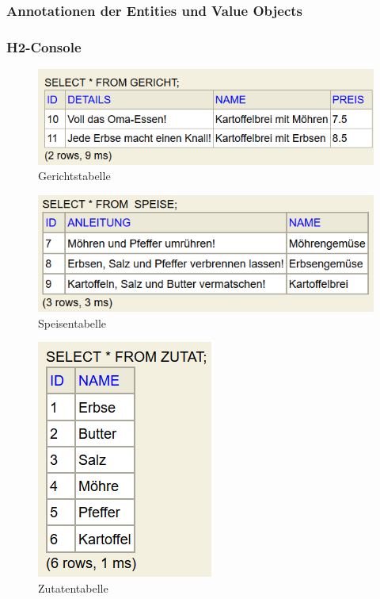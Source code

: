 \subsubsection{Annotationen der Entities und Value Objects}


\subsubsection{H2-Console}

\begin{figure}[H]
\centering
\includegraphics{ms1/screenshots/gericht_table.PNG}
\caption{Gerichtstabelle}
\end{figure}

\begin{figure}[H]
\centering
\includegraphics{ms1/screenshots/speise_tbl.PNG}
\caption{Speisentabelle}
\end{figure}

\begin{figure}[H]
\centering
\includegraphics{ms1/screenshots/zutat_tbl.PNG}
\caption{Zutatentabelle}
\end{figure}

